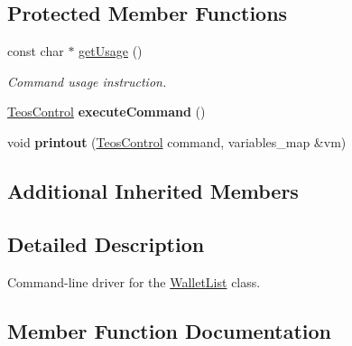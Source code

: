 \subsection*{Protected Member Functions}
\begin{DoxyCompactItemize}
\item 
const char $\ast$ \mbox{\hyperlink{classteos_1_1command_1_1_wallet_list_options_ae6394f5f8c311fc9e56b0d44562cea67}{get\+Usage}} ()
\begin{DoxyCompactList}\small\item\em Command \textquotesingle{}usage\textquotesingle{} instruction. \end{DoxyCompactList}\item 
\mbox{\label{classteos_1_1command_1_1_wallet_list_options_a5e7955184f761fd355e8081757fb281e}} 
\mbox{\hyperlink{classteos_1_1_teos_control}{Teos\+Control}} {\bfseries execute\+Command} ()
\item 
\mbox{\label{classteos_1_1command_1_1_wallet_list_options_a7f11798f8864183fc502bf9b3d11d302}} 
void {\bfseries printout} (\mbox{\hyperlink{classteos_1_1_teos_control}{Teos\+Control}} command, variables\+\_\+map \&vm)
\end{DoxyCompactItemize}
\subsection*{Additional Inherited Members}


\subsection{Detailed Description}
Command-\/line driver for the \mbox{\hyperlink{classteos_1_1command_1_1_wallet_list}{Wallet\+List}} class. 

\subsection{Member Function Documentation}
\mbox{\label{classteos_1_1command_1_1_wallet_list_options_ae6394f5f8c311fc9e56b0d44562cea67}} 
